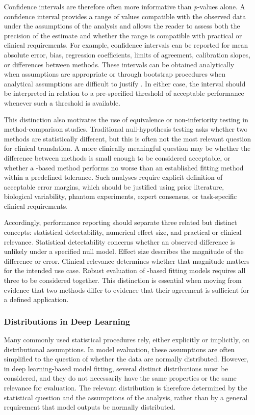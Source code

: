 Confidence intervals are therefore often more informative than \textit{p}-values alone. A confidence interval provides a range of values compatible with the observed data under the assumptions of the analysis and allows the reader to assess both the precision of the estimate and whether the range is compatible with practical or clinical requirements. For example, confidence intervals can be reported for mean absolute error, bias, regression coefficients, limits of agreement, calibration slopes, or differences between methods. These intervals can be obtained analytically when assumptions are appropriate or through bootstrap procedures when analytical assumptions are difficult to justify \cite{Hazra2017}. In either case, the interval should be interpreted in relation to a pre-specified threshold of acceptable performance whenever such a threshold is available.

This distinction also motivates the use of equivalence or non-inferiority testing in method-comparison studies. Traditional null-hypothesis testing asks wheth\-er two methods are statistically different, but this is often not the most relevant question for clinical translation. A more clinically meaningful question may be whether the difference between methods is small enough to be considered acceptable, or whether a \DL-based method performs no worse than an established fitting method within a predefined tolerance. Such analyses require explicit definition of acceptable error margins, which should be justified using prior literature, biological variability, phantom experiments, expert consensus, or task-specific clinical requirements.

Accordingly, performance reporting should separate three related but distinct concepts: statistical detectability, numerical effect size, and practical or clinical relevance. Statistical detectability concerns whether an observed difference is unlikely under a specified null model. Effect size describes the magnitude of the difference or error. Clinical relevance determines whether that magnitude matters for the intended use case. Robust evaluation of \DL-based fitting models requires all three to be considered together. This distinction is essential when moving from evidence that two methods differ to evidence that their agreement is sufficient for a defined application.

\subsubsection{Distributions in Deep Learning}
Many commonly used statistical procedures rely, either explicitly or implicitly, on distributional assumptions. In model evaluation, these assumptions are often simplified to the question of whether the data are normally distributed. However, in deep learning-based model fitting, several distinct distributions must be considered, and they do not necessarily have the same properties or the same relevance for evaluation. The relevant distribution is therefore determined by the statistical question and the assumptions of the analysis, rather than by a general requirement that model outputs be normally distributed.

